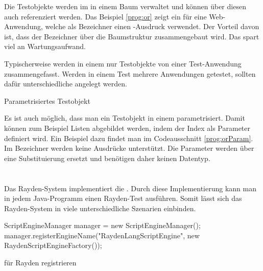 \SuperPar
Die Testobjekte werden im  in einem Baum verwaltet und können über diesen auch referenziert werden. Das Beispiel \ref{prog:or} zeigt ein  für eine Web-Anwendung, welche als Bezeichner einen -Ausdruck verwendet.  Der Vorteil davon ist, dass der Bezeichner  über die Baumstruktur zusammengebaut wird. Das spart viel an Wartungsaufwand. 

\SuperPar
Typischerweise werden in einem  nur Testobjekte von einer Test-Anwendung zusammengefasst. Werden in einem Test mehrere Anwendungen getestet, sollten dafür unterschiedliche  angelegt werden.

\begin{program}
\caption{Parametrisiertes Testobjekt}
\label{prog:orParam}
\end{program}

\SuperPar
Es ist auch möglich, dass man ein Testobjekt in einem  parametrisiert. Damit können zum Beispiel Listen abgebildet werden, indem der Index als Parameter definiert wird. Ein Beispiel dazu findet man im Codeausschnitt \ref{prog:orParam}. Im Bezeichner  werden keine Ausdrücke unterstützt. Die Parameter werden über eine Substituierung ersetzt und benötigen daher keinen Datentyp.


\section{}

Das Rayden-System implementiert die . Durch diese Implementierung kann man in jedem Java-Programm einen Rayden-Test ausführen. Somit lässt sich das Rayden-System in viele unterschiedliche Szenarien einbinden. 

\begin{program}
\begin{JavaCode}
ScriptEngineManager manager = new ScriptEngineManager();
manager.registerEngineName("RaydenLangScriptEngine", 
    new RaydenScriptEngineFactory());
\end{JavaCode}
\caption{ für Rayden registrieren}
\label{prog:registerFactory}
\end{program}

